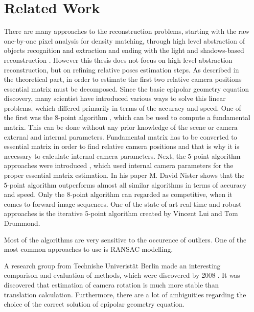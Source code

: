 
\chapter{Related Work} %
There are many approaches to the reconstruction problems, starting with the raw one-by-one pixel analysis for density matching, through high level abstraction of objects recognition and extraction and ending with the light and shadows-based reconstruction \cite{objectRecAndLoc}\cite{combinedMonoSlam}.
However this thesis does not focus on high-level abstraction reconstruction, but on refining relative poses estimation steps. As described in the theoretical part, in order to estimate the first two relative camera positions essential matrix must be decomposed. 
Since the basic epipolar geometry equation discovery, many scientist have introduced various ways to solve this linear problems, wchich differed primarily in terms of the accuracy and speed. One of the first was the 8-point algorithm \cite{8Point}, which can be used to compute a fundamental matrix. This can be done without any prior knowledge of the scene or camera external and internal parameters. Fundamental matrix has to be converted to essential matrix in order to find relative camera positions and that is why it is necessary to calculate internal camera parameters. Next, the 5-point algorithm approaches were introduced \cite{Batra5point} \cite{Nister5point}, which used internal camera parameters for the proper essential matrix estimation. In his paper M. David Nister shows that the 5-point algorithm outperforms almost all similar algorithms in terms of accuracy and speed. Only the 8-point algorithm can regarded as competitive, when it comes to forward image sequences. One of the state-of-art real-time and robust approaches is the iterative 5-point algorithm created by Vincent Lui and Tom Drummond\cite{iterative5point}.

Most of the algorithms are very sensitive to the occurence of outliers. One of the most common approaches to use is RANSAC modelling\cite{RansacRefine}.

A research group from Technishe Univeristät Berlin made an interesting comparison and evaluation of methods, which were discovered by 2008 \cite{HellwichEvaluation}. It was discovered that estimation of camera rotation is much more stable than translation calculation. Furthermore, there are a lot of ambiguities regarding the choice of the correct solution of epipolar geometry equation. 

